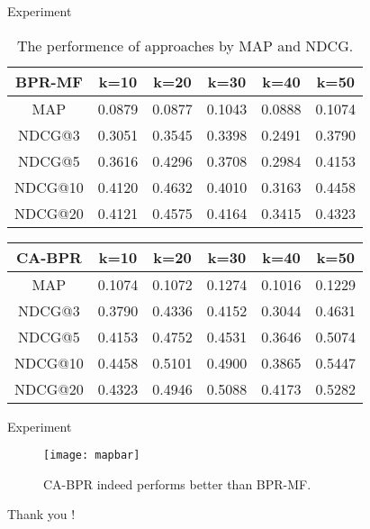 \begin{frame}{Experiment}
	\begin{table}[htbp]
		\caption{The performence of approaches by MAP and NDCG.}
		\label{tab:mapandndcg}
		\begin{center}
			\begin{tabular}{|c | c |c |c|c|c|}
				\hline
				BPR-MF  &   k=10 &   k=20 &    k=30&    k=40&    k=50\\
				\hline
				MAP      &  0.0879&  0.0877&  0.1043&  0.0888&  0.1074\\
				\hline
				NDCG@3   &  0.3051&  0.3545&  0.3398&  0.2491&  0.3790\\
				NDCG@5   &  0.3616&  0.4296&  0.3708&  0.2984&  0.4153\\
				NDCG@10  &  0.4120&  0.4632&  0.4010&  0.3163&  0.4458\\
				NDCG@20  &  0.4121&  0.4575&  0.4164&  0.3415&  0.4323\\
				\hline
			\end{tabular}
		\end{center}
	\end{table}
	
	\begin{table}
		
		\begin{center}
			
			\begin{tabular}{|c | c |c |c|c|c|}
				\hline
				CA-BPR  &     k=10&   k=20 &    k=30&  k=40 &   k=50  \\
				\hline
				MAP     &   0.1074&  0.1072&  0.1274&  0.1016&  0.1229\\
				\hline
				NDCG@3  &   0.3790&  0.4336&  0.4152&  0.3044&  0.4631\\
				NDCG@5  &   0.4153&  0.4752&  0.4531&  0.3646&  0.5074\\
				NDCG@10 &   0.4458&  0.5101&  0.4900&  0.3865&  0.5447\\
				NDCG@20 &   0.4323&  0.4946&  0.5088&  0.4173&  0.5282\\
				\hline
			\end{tabular}
		\end{center}
	\end{table}
\end{frame}

\begin{frame}{Experiment}
	\begin{figure}
		\begin{center}
			\texttt{[image: mapbar]}
		\end{center}
		\caption{CA-BPR indeed performs better than BPR-MF.}
	\end{figure}
\end{frame}

\begin{frame}
	\centering
	\Huge Thank you !
\end{frame}